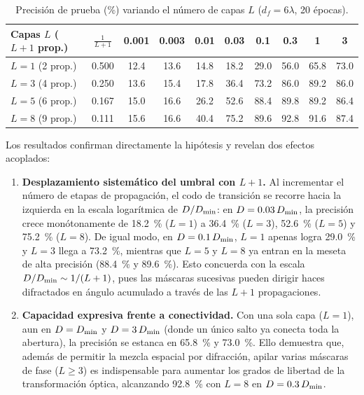 \begin{table}[htbp]
\centering
\caption{Precisión de prueba (\%) variando el número de capas $L$ ($d_f=6\lambda$, 20 épocas).}
\label{tab:barrido-capas}
\begin{tabular}{@{}lccccccccc@{}}
\toprule
Capas $L$ ($L+1$ prop.) & $\frac{1}{L+1}$ & 0.001 & 0.003 & 0.01 & 0.03 & 0.1 & 0.3 & 1 & 3\\
\midrule
$L=1$ (2 prop.) & 0.500 & 12.4 & 13.6 & 14.8 & 18.2 & 29.0 & 56.0 & 65.8 & 73.0\\
$L=3$ (4 prop.) & 0.250 & 13.6 & 15.4 & 17.8 & 36.4 & 73.2 & 86.0 & 89.2 & 86.0\\
$L=5$ (6 prop.) & 0.167 & 15.0 & 16.6 & 26.2 & 52.6 & 88.4 & 89.8 & 89.2 & 86.4\\
$L=8$ (9 prop.) & 0.111 & 15.6 & 16.6 & 40.4 & 75.2 & 89.6 & 92.8 & 91.6 & 87.4\\
\bottomrule
\end{tabular}
\end{table}

Los resultados confirman directamente la hipótesis y revelan dos efectos acoplados:
\begin{enumerate}
  \item \textbf{Desplazamiento sistemático del umbral con $L+1$.} Al incrementar el número de
  etapas de propagación, el codo de transición se recorre hacia la izquierda en la escala
  logarítmica de $D/D_{\min}$: en $D=0.03\,D_{\min}$, la precisión crece monótonamente de
  \SI{18.2}{\percent} ($L=1$) a \SI{36.4}{\percent} ($L=3$), \SI{52.6}{\percent} ($L=5$) y
  \SI{75.2}{\percent} ($L=8$). De igual modo, en $D=0.1\,D_{\min}$, $L=1$ apenas logra
  \SI{29.0}{\percent} y $L=3$ llega a \SI{73.2}{\percent}, mientras que $L=5$ y $L=8$ ya entran
  en la meseta de alta precisión (\SI{88.4}{\percent} y \SI{89.6}{\percent}). Esto concuerda con
  la escala $D/D_{\min}\sim 1/(L+1)$, pues las máscaras sucesivas pueden dirigir haces difractados en
  ángulo acumulado a través de las $L+1$ propagaciones.
  \item \textbf{Capacidad expresiva frente a conectividad.} Con una sola capa ($L=1$), aun en
  $D=D_{\min}$ y $D=3\,D_{\min}$ (donde un único salto ya conecta toda la abertura), la precisión se
  estanca en \SI{65.8}{\percent} y \SI{73.0}{\percent}. Ello demuestra que, además de permitir la
  mezcla espacial por difracción, apilar varias máscaras de fase ($L\ge 3$) es indispensable para
  aumentar los grados de libertad de la transformación óptica, alcanzando \SI{92.8}{\percent} con
  $L=8$ en $D=0.3\,D_{\min}$.
\end{enumerate}


